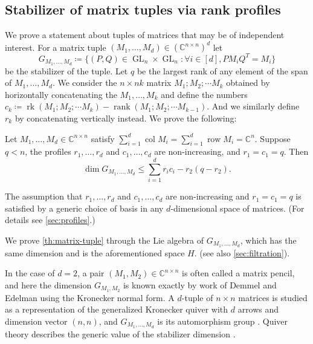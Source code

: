 \documentclass[11pt,a4paper]{article}
\numberwithin{equation}{section}
\newcommand{\CC}{\mathbb{C}}
\DeclareMathOperator{\GL}{GL}
\DeclareMathOperator{\rank}{rank}
\DeclareMathOperator{\col}{col}
\DeclareMathOperator{\rk}{rk}
\DeclareMathOperator{\row}{row}
\begin{document}
%

\subsection{Stabilizer of matrix tuples via rank profiles}\label{subsec:matrix-tuples}

We prove a statement about tuples of matrices that may be of independent interest. For a matrix tuple $(M_1, \ldots, M_d) \in (\CC^{n\times n})^d$ let
\[
G_{M_1, \ldots, M_d} \coloneqq \{(P,Q) \in \GL_n \times \GL_n : \forall i \in [d], P M_i Q^T = M_i\}
\]
be the stabilizer of the tuple. Let $q$ be the largest rank of any element of the span of $M_1, \ldots, M_d$. 
We consider the $n \times nk$ matrix $M_1 ; M_2 ; \cdots M_k$ obtained by horizontally concatenating the $M_1, \ldots, M_k$ and define the numbers $c_k \coloneqq \rk(M_1 ; M_2 ; \cdots M_k) - \rank(M_1 ; M_2 ; \cdots M_{k-1})$. And we similarly define $r_k$ by concatenating vertically instead. 
We prove the following:

\begin{theorem}\label{th:matrix-tuple}
Let $M_1, \ldots, M_d \in \CC^{n\times n}$ satisfy $\sum_{i=1}^d \col M_i = \sum_{i=1}^d \row M_i = \CC^n$. Suppose $q < n$, the profiles $r_1, \ldots, r_d$ and $c_1, \ldots, c_d$ are non-increasing, and $r_1 = c_1 = q$. Then
\[
\dim G_{M_1, \ldots, M_d} \leq \sum_{i=1}^d r_i c_i - r_2(q-r_2).
\]
\end{theorem}

The assumption that $r_1, \ldots, r_d$ and $c_1, \ldots, c_d$ are non-increasing and $r_1 = c_1 = q$ is satisfied by a generic choice of basis in any $d$-dimensional space of matrices. (For details see \cref{sec:profiles}.)

We prove \cref{th:matrix-tuple} through the Lie algebra of $G_{M_1, \ldots, M_d}$, which has the same dimension and is the aforementioned space $H$.
%
%
%
(see also \cref{sec:filtration}).

%

In the case of $d = 2$, a pair $(M_1, M_2) \in \CC^{n \times n}$ is often called a matrix pencil, and here the dimension $G_{M_1, M_2}$ is known exactly by work of Demmel and Edelman \cite{MR1355688} using the Kronecker normal form. %
%
%
A $d$-tuple of $n \times n$ matrices is studied as a representation of the generalized Kronecker quiver with $d$ arrows and dimension vector $(n,n)$, and $G_{M_1, \ldots, M_d}$ is its automorphism group \cite[Example~9.8.6]{MR3727119}. 
%
%
Quiver theory describes the generic value of the stabilizer dimension \cite{MR1162487}. %
\end{document}
